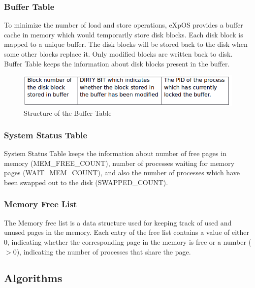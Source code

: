 \documentclass[10pt]{article}
\begin{document}
\subsubsection{Buffer Table}

To minimize the number of load and store operations, eXpOS provides a buffer cache in memory which would temporarily store disk blocks. Each disk block is mapped to a unique buffer. The disk blocks will be stored back to the disk when some other blocks replace it. Only modified blocks are written back to disk.
Buffer Table keeps the information about disk blocks present in the buffer.
\begin{figure}[ht]
\centering
\includegraphics[scale=0.50]{Buffer_table.png}
\caption{\footnotesize Structure of the Buffer Table}
\label{fig_8}
\end{figure}
\subsubsection{System Status Table}

System Status Table keeps the information about number of free pages in memory (MEM\_FREE\_COUNT), number of processes waiting for memory pages (WAIT\_MEM\_COUNT), and also the number of processes which have been swapped out to the disk (SWAPPED\_COUNT).
\subsubsection{Memory Free List}

The Memory free list is a data structure used for keeping track of used and unused pages in the memory. Each entry of the free list contains a value of either 0, indicating whether the corresponding page in the memory is free or a number ($>$0), indicating the number of processes that share the page.
\subsection{Algorithms}
\end{document}
